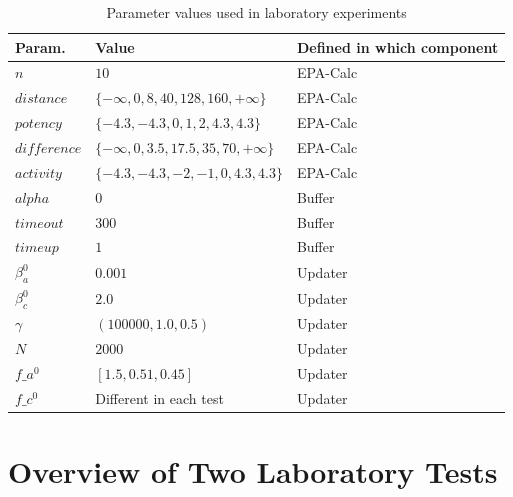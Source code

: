 %
\begin{table}
\centering
\caption{Parameter values used in laboratory experiments}
\label{table:param-setting}
\begin{tabular}{| l | l | l |}
\hline
\textbf{Param.} & \textbf{Value} & \textbf{Defined in which component} \\ \hline
$n$ & $10$ & EPA-Calc \\ \hline
$distance$ & $\{-\infty, 0, 8, 40, 128, 160, +\infty\}$ & EPA-Calc \\ \hline
$potency$ & $\{-4.3, -4.3, 0, 1, 2, 4.3, 4.3\}$ & EPA-Calc \\ \hline 
$difference$ & $\{-\infty, 0, 3.5, 17.5, 35, 70, +\infty\}$ & EPA-Calc \\ \hline
$activity$ & $\{-4.3, -4.3, -2, -1, 0, 4.3, 4.3\}$ & EPA-Calc \\ \hline
$alpha$ & $0$ & Buffer \\ \hline
$timeout$ & $300$ & Buffer \\ \hline
$timeup$ & $1$ & Buffer \\ \hline
$\beta_{a}^{0}$ & $0.001$ & Updater \\ \hline
$\beta_{c}^{0}$ & $2.0$ & Updater \\ \hline
$\gamma$ & $(100000, 1.0, 0.5)$ & Updater \\ \hline
$N$ & $2000$ & Updater \\ \hline
$f\_a^{0}$ & $[1.5, 0.51, 0.45]$ & Updater \\ \hline
$f\_c^{0}$ & Different in each test &Updater \\ \hline
\end{tabular}
\end{table}

\section{Overview of Two Laboratory Tests}

%

